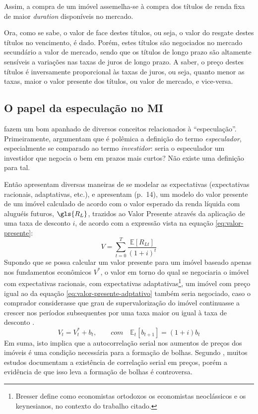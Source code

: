\documentclass[
	12pt,				%
	oneside,			%
	a4paper,			%
	chapter=TITLE,		%
	section=TITLE,		%
	english,			%
	brazil				%
	]{abntex2}
\begin{document}
Assim, a compra de um imóvel assemelha-se à compra dos títulos de renda fixa de
maior \emph{duration} disponíveis no mercado.

Ora, como se sabe, o valor de face destes títulos, ou seja, o valor do resgate
destes títulos no vencimento, é dado. Porém, estes títulos são negociados no
mercado secundário a valor de mercado, sendo que os títulos de longo prazo são
altamente sensíveis a variações nas taxas de juros de longo prazo. A saber, o
preço destes títulos é inversamente proporcional às taxas de juros, ou seja,
quanto menor as taxas, maior o valor presente dos títulos, ou valor de mercado,
e vice-versa.

\hypertarget{o-papel-da-especulauxe7uxe3o-no}{%
\subsection{\texorpdfstring{O papel da especulação no \gls{MI}}{O papel da especulação no }}\label{o-papel-da-especulauxe7uxe3o-no}}

\textcite[p.~5]{Malpezzi2002TheRO} fazem um bom apanhado de diversos conceitos relacionados à
``especulação''. Primeiramente, argumentam que é polêmica a definição do termo
\emph{especulador}, especialmente se comparado ao termo \emph{investidor}: seria o
especulador um investidor que negocia o bem em prazos mais curtos? Não existe
uma definição para tal.

Então \textcite[p.~12]{Malpezzi2002TheRO} apresentam diversas maneiras de se modelar as
expectativas (expectativas racionais, adaptativas, etc.), e apresentam (p.~14),
um modelo do valor presente de um imóvel calculado de acordo com o valor
esperado da renda líquida com aluguéis futuros, \(\gls{R_L}\), trazidos ao Valor
Presente através da aplicação de uma taxa de desconto \(i\), de acordo com a
expressão vista na equação \eqref{eq:valor-presente}:
\begin{equation}
V = \sum_{t = 0}^T \frac{\mathbb{E}[R_{Lt}]}{(1+i)^t}
\label{eq:valor-presente}
\end{equation}
Supondo que se possa calcular um valor presente para um imóvel baseado apenas
nos fundamentos econômicos \(V^*\), o valor em torno do qual se negociaria o
imóvel com expectativas racionais, com expectativas adaptativas\footnote{Bresser define como economistas ortodoxos os economistas neoclássicos e os
  keynesianos, no contexto do trabalho citado.}, um imóvel
com preço igual ao da equação \eqref{eq:valor-presente-adptativo} também seria
negociado, caso o comprador considerasse que grau de supervalorização do imóvel
continuasse a crescer nos períodos subsequentes por uma taxa maior ou igual à
taxa de desconto \autocite[15]{Malpezzi2002TheRO}.
\begin{equation}
V_t = V_t^* + b_t, \qquad com \quad \mathbb{E}_t[b_{t+1}] = (1+i)b_t
\label{eq:valor-presente-adptativo}
\end{equation}
Em suma, isto implica que a autocorrelação serial nos aumentos de preços dos
imóveis é uma condição necessária para a formação de bolhas. Segundo
\textcite[p.~15]{Malpezzi2002TheRO}, muitos estudos documentam a existência de correlação
serial em preços, porém a evidência de que isso leva a formação de bolhas é
controversa.
\end{document}
